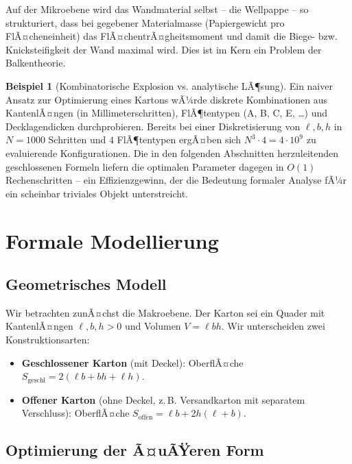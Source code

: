 ﻿\documentclass[a4paper,12pt]{article}
\theoremstyle{definition}
\newtheorem{beispiel}{Beispiel}
\begin{document}
Auf der Mikroebene wird das Wandmaterial selbst -- die Wellpappe -- so strukturiert,
dass bei gegebener Materialmasse (Papiergewicht pro FlÃ¤cheneinheit) das
FlÃ¤chentrÃ¤gheitsmoment und damit die Biege- bzw. Knicksteifigkeit der Wand maximal
wird. Dies ist im Kern ein Problem der Balkentheorie.

\begin{beispiel}[Kombinatorische Explosion vs. analytische LÃ¶sung]
	Ein naiver Ansatz zur Optimierung eines Kartons wÃ¼rde diskrete Kombinationen
	aus KantenlÃ¤ngen (in Millimeterschritten), FlÃ¶tentypen (A, B, C, E, \ldots)
	und Decklagendicken durchprobieren. Bereits bei einer Diskretisierung von
	$\ell, b, h$ in $N = 1000$ Schritten und $4$ FlÃ¶tentypen ergÃ¤ben sich
	$N^3 \cdot 4 = 4 \cdot 10^9$ zu evaluierende Konfigurationen. Die in den
	folgenden Abschnitten herzuleitenden geschlossenen Formeln liefern die
	optimalen Parameter dagegen in $O(1)$ Rechenschritten -- ein Effizienzgewinn,
	der die Bedeutung formaler Analyse fÃ¼r ein scheinbar triviales Objekt
	unterstreicht.
\end{beispiel}

\section{Formale Modellierung}

\subsection{Geometrisches Modell}

Wir betrachten zunÃ¤chst die Makroebene. Der Karton sei ein Quader mit KantenlÃ¤ngen
$\ell, b, h > 0$ und Volumen $V = \ell b h$. Wir unterscheiden zwei Konstruktionsarten:

\begin{itemize}
	\item \textbf{Geschlossener Karton} (mit Deckel): OberflÃ¤che
	      $S_{\mathrm{geschl}} = 2(\ell b + bh + \ell h)$.
	\item \textbf{Offener Karton} (ohne Deckel, z.\,B. Versandkarton mit
	      separatem Verschluss): OberflÃ¤che
	      $S_{\mathrm{offen}} = \ell b + 2h(\ell + b)$.
\end{itemize}

\subsection{Optimierung der Ã¤uÃŸeren Form}
\end{document}
